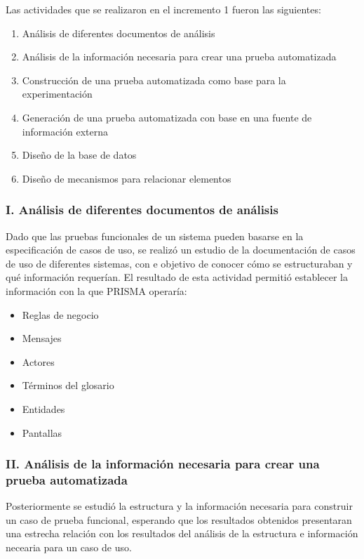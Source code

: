 Las actividades que se realizaron en el incremento 1 fueron las siguientes:

{\small
\begin{enumerate}[label=\Roman*.]
	\item Análisis de diferentes documentos de análisis
	\item Análisis de la información necesaria para crear una prueba automatizada
	\item Construcción de una prueba automatizada como base para la experimentación
	\item Generación de una prueba automatizada con base en una fuente de información externa
	\item Diseño de la base de datos
	\item Diseño de mecanismos para relacionar elementos
\end{enumerate}
}	
	
\subsubsection*{I. Análisis de diferentes documentos de análisis}
	Dado que las pruebas funcionales de un sistema pueden basarse en la especificación de casos de uso, se realizó un estudio de la documentación de casos de uso de diferentes sistemas, con e objetivo de conocer cómo se estructuraban y qué información requerían. El resultado de esta actividad permitió establecer la información con la que PRISMA operaría:
	\begin{itemize}
		\item Reglas de negocio
		\item Mensajes
		\item Actores
		\item Términos del glosario
		\item Entidades
		\item Pantallas
	\end{itemize}
	
\subsubsection*{II. Análisis de la información necesaria para crear una prueba automatizada}
		
	Posteriormente se estudió la estructura y la información necesaria para construir un caso de prueba funcional, esperando que los resultados obtenidos presentaran una estrecha relación con los resultados del análisis de la estructura e información necearia para un caso de uso.\\
		
